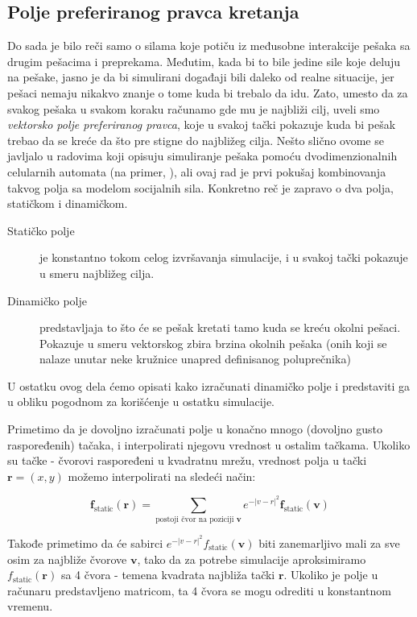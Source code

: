 \documentclass[12pt]{article}
\begin{document}
    \subsection{Polje preferiranog pravca kretanja}
    Do sada je bilo reči samo o silama koje potiču iz međusobne interakcije pešaka sa drugim pešacima i preprekama. Međutim, kada bi to bile jedine sile koje deluju na pešake, jasno je da bi simulirani događaji bili daleko od realne situacije, jer pešaci nemaju nikakvo znanje o tome kuda bi trebalo da idu. Zato, umesto da za svakog pešaka u svakom koraku računamo gde mu je najbliži cilj, uveli smo \emph{vektorsko polje preferiranog pravca}, koje u svakoj tački pokazuje kuda bi pešak trebao da se kreće da što pre stigne do najbližeg cilja. Nešto slično ovome se javljalo u radovima koji opisuju simuliranje pešaka pomoću dvodimenzionalnih celularnih automata (na primer, \citep{Burstedde2001}), ali ovaj rad je prvi pokušaj kombinovanja takvog polja sa modelom socijalnih sila. Konkretno reč je zapravo o dva polja, statičkom i dinamičkom.
    \begin{description}
        \item[Statičko polje] je konstantno tokom celog izvršavanja simulacije, i u svakoj tački pokazuje u smeru najbližeg cilja.
        \item[Dinamičko polje] predstavljaja to što će se pešak kretati tamo kuda se kreću okolni pešaci. Pokazuje u smeru vektorskog zbira brzina okolnih pešaka (onih koji se nalaze unutar neke kružnice unapred definisanog poluprečnika)
    \end{description}
    U ostatku ovog dela ćemo opisati kako izračunati dinamičko polje i predstaviti ga u obliku pogodnom za korišćenje u ostatku simulacije. 
    
    Primetimo da je dovoljno izračunati polje u konačno mnogo (dovoljno gusto raspoređenih) tačaka, i interpolirati njegovu vrednost u ostalim tačkama. Ukoliko su tačke - čvorovi raspoređeni u kvadratnu mrežu, vrednost polja u tački $\mathbf r = (x,y)$ možemo interpolirati na sledeći način:
    
    $$
    	\mathbf f_\text{static} (\mathbf r) = \sum_{\text{postoji čvor na poziciji } \mathbf v} e^{-|v-r|^2} \mathbf f_\text{static} (\mathbf v)
    $$
	
	Takođe primetimo da će sabirci $e^{-|v-r|^2} f_\text{static} (\mathbf v)$ biti zanemarljivo mali za sve osim za najbliže čvorove $\mathbf v$, tako da za potrebe simulacije aproksimiramo $f_\text{static} (\mathbf r)$ sa 4 čvora - temena kvadrata najbliža tački $\mathbf r$. Ukoliko je polje u računaru predstavljeno matricom, ta 4 čvora se mogu odrediti u konstantnom vremenu.
	
\end{document}
